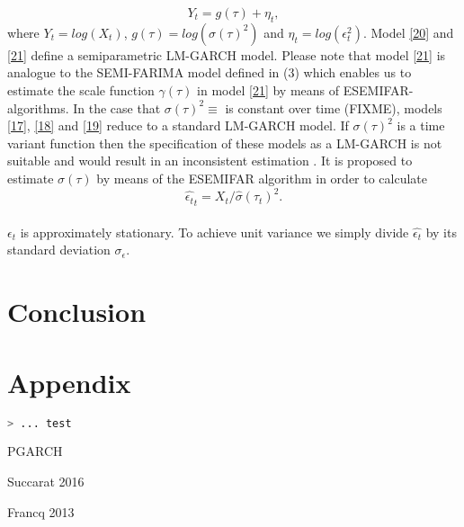 \documentclass[12pt]{article}
\newtheorem{theorem}{Theorem}
\begin{document}
\begin{equation}
\label{21}
	Y_t=g(\tau)+\eta_t,
\end{equation} 
where $Y_t=log(X_t)$, $g(\tau)=log(\sigma(\tau)^2)$ and $\eta_t=log(\epsilon_t^2)$. Model \eqref{20} and \eqref{21} define a semiparametric LM-GARCH model.     Please note that model \eqref{21} is analogue to the SEMI-FARIMA model defined in (3) which enables us to estimate the scale function $\gamma(\tau)$ in model \eqref{21} by means of ESEMIFAR-algorithms. In the case that $\sigma(\tau)^2\equiv$ is constant over time (FIXME), models \eqref{17}, \eqref{18} and \eqref{19} reduce to a standard LM-GARCH model. If $\sigma(\tau)^2$ is a time variant function then the specification of these models as a LM-GARCH is not suitable and would result in an inconsistent estimation \citep{feng2004simultaneously}. It is proposed to estimate $\sigma(\tau)$ by means of the ESEMIFAR algorithm in order to calculate
\begin{equation}
	\hat{\epsilon_t}_t=X_t/\hat{\sigma}(\tau_t)^2.
\end{equation}   \\
$\hat{\epsilon_t}$ is approximately stationary. To achieve unit variance we simply divide $\hat{\epsilon_t}$ by its standard deviation $\sigma_{\epsilon}$.

\clearpage
\section{Conclusion}
\section{Appendix}
\clearpage
\begin{lstlisting}[language=Python]
> ... test
\end{lstlisting}
PGARCH

Succarat 2016

Francq 2013

\clearpage
\printbibliography
\end{document}

